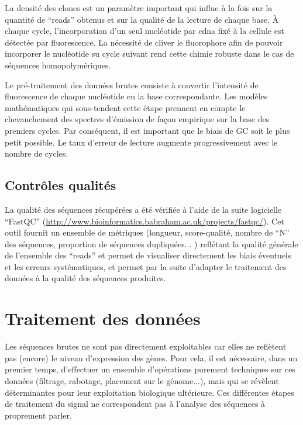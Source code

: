 \documentclass[../main.tex]{subfiles}
\begin{document}
		La densité des clones est un paramètre important qui influe à la fois sur la quantité de ``reads'' obtenus et sur la qualité de la lecture de chaque base.
		À chaque cycle, l'incorporation d'un seul nucléotide par \gls{cdna} fixé à la cellule est détectée par fluorescence.
		La nécessité de cliver le fluorophore afin de pouvoir incorporer le nucléotide su cycle suivant rend cette chimie robuste dans le cas de séquences homopolymériques.
		\par
		Le pré-traitement des données brutes consiste à convertir l'intensité de fluorescence de chaque nucléotide en la base correspondante.
		Les modèles mathématiques qui sous-tendent cette étape prennent en compte le chevauchement des spectres d'émission de façon empirique sur la base des premiers cycles.
		Par conséquent, il est important que le biais de GC soit le plus petit possible.
		Le taux d'erreur de lecture augmente progressivement avec le nombre de cycles.

	\subsection{Contrôles qualités}
		La qualité des séquences récupérées a été vérifiée à l'aide de la suite logicielle ``FastQC'' (\url{http://www.bioinformatics.babraham.ac.uk/projects/fastqc/}).
		Cet outil fournit un ensemble de métriques (longueur, score-qualité, nombre de ``N'' des séquences, proportion de séquences dupliquées... ) reflétant la qualité générale de l'ensemble des ``reads'' et permet de visualiser directement les biais éventuels et les erreurs systématiques, et permet par la suite d'adapter le traitement des données à la qualité des séquences produites.




\section{Traitement des données}
	Les séquences brutes ne sont pas directement exploitables car elles ne reflètent pas (encore) le niveau d'expression des gènes.
	Pour cela, il est nécessaire, dans un premier temps, d'effectuer un ensemble d'opérations purement techniques sur ces données (filtrage, rabotage, placement sur le génome...), mais qui se révèlent déterminantes pour leur exploitation biologique ultérieure.
	Ces différentes étapes de traitement du signal ne correspondent pas à l'analyse des séquences à proprement parler.
\end{document}
